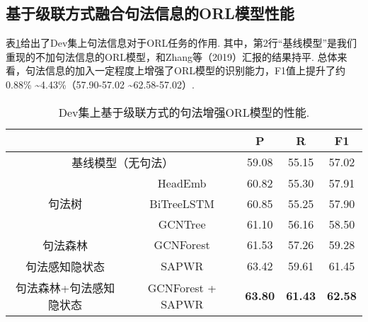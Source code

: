 \subsection{基于级联方式融合句法信息的ORL模型性能}

表\ref{tb:orl_rst_pipeline}给出了Dev集上句法信息对于ORL任务的作用. 其中，第2行“基线模型”是我们重现的不加句法信息的ORL模型，和Zhang等（2019）汇报的结果持平. 总体来看，句法信息的加入一定程度上增强了ORL模型的识别能力，F1值上提升了约0.88\% \textasciitilde 4.43\%（57.90-57.02 \textasciitilde 62.58-57.02）.
\begin{table}[hb!]
    \centering
    \caption{Dev集上基于级联方式的句法增强ORL模型的性能. }
    \label{tb:orl_rst_pipeline}
    \begin{tabular}{cc c c c  } \toprule
                                               &                   & \textbf{P}     & \textbf{R}     & \textbf{F1 }   \\ \hline
        \multicolumn{2}{c}{基线模型（无句法）} & 59.08             & 55.15          & 57.02                           \\ \midrule
        \multirow{3}{*}{句法树}                & HeadEmb           & 60.82          & 55.30          & 57.91          \\
                                               & BiTreeLSTM        & {60.85}        & {55.25}        & {57.90}        \\
                                               & GCNTree           & 61.10          & 56.16          & 58.50          \\  \hline
        句法森林                               & GCNForest         & 61.53          & 57.26          & 59.28          \\  \midrule
        句法感知隐状态                         & SAPWR             & 63.42          & 59.61          & 61.45          \\
        \midrule
        句法森林+句法感知隐状态                & GCNForest + SAPWR & \textbf{63.80} & \textbf{61.43} & \textbf{62.58} \\
        \bottomrule


\end{tabular}
\end{table}
